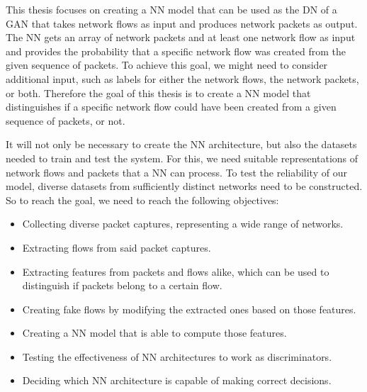 \documentclass[
	ngerman,
	ruledheaders=section,%
	class=report,%
	thesis={type=bachelor},%
	accentcolor=9c,%
	custommargins=true,%
	marginpar=false,%
	parskip=half-,%
	fontsize=11pt,%
	twoside
]{tudapub}
\begin{document}

This thesis focuses on creating a NN model
that can be used as the DN of a GAN
that takes network flows as input and produces network packets as output.
The NN gets an array of network packets and at least one network flow as input
and provides the probability that a specific network flow was created from the given sequence of packets.
To achieve this goal, we might need to consider additional input,
such as labels for either the network flows, the network packets, or both.
Therefore the goal of this thesis is to create a NN model that distinguishes
if a specific network flow could have been created from a given sequence of packets, or not.

It will not only be necessary to create the NN architecture,
but also the datasets needed to train and test the system.
For this, we need suitable representations of network flows and packets that a NN can process.
To test the reliability of our model, diverse datasets from sufficiently distinct networks need to be constructed.
So to reach the goal, we need to reach the following objectives:

\begin{itemize}
  \item Collecting diverse packet captures, representing a wide range of networks.
  \item Extracting flows from said packet captures.
  \item Extracting features from packets and flows alike,
which can be used to distinguish if packets belong to a certain flow.
  \item Creating fake flows by modifying the extracted ones based on those features.
  \item Creating a NN model that is able to compute those features.
  \item Testing the effectiveness of NN architectures to work as discriminators.
  \item Deciding which NN architecture is capable of making correct decisions.
\end{itemize}
\end{document}
